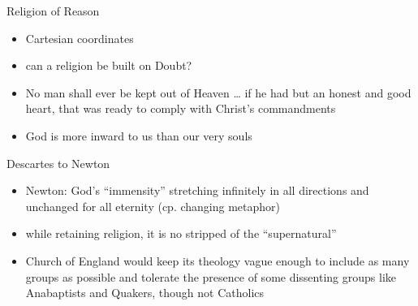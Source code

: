 \begin{frame}[label=sec-1-7]{Religion of Reason}
\begin{itemize}
\item Cartesian coordinates
\item can a religion be built on Doubt?
\item No man shall ever be kept out of Heaven … if he had but an honest and good heart, that was ready to comply with Christ’s commandments
\item God is more inward to us than our very souls
\end{itemize}
\end{frame}

\begin{frame}[label=sec-1-8]{Descartes to Newton}
\begin{itemize}
\item Newton: God’s ``immensity'' stretching infinitely in all directions and unchanged for all eternity (cp. changing metaphor)
\item while retaining religion, it is no stripped of the ``supernatural''
\item Church of England would keep its theology vague enough to include as many groups as possible and tolerate the presence of some dissenting groups like Anabaptists and Quakers, though not Catholics
\end{itemize}
\end{frame}

